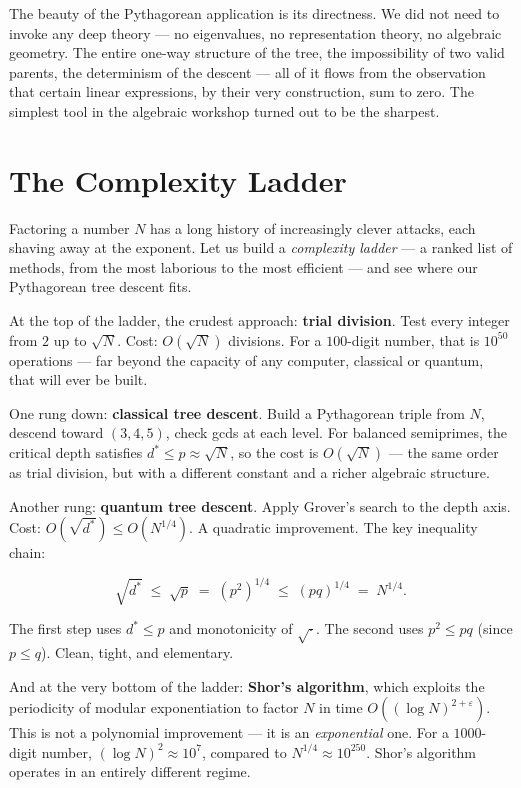 \documentclass[11pt,twoside,openright]{book}
\theoremstyle{definition}
\theoremstyle{remark}
\begin{document}
The beauty of the Pythagorean application is its directness. We did not need to invoke any deep theory --- no eigenvalues, no representation theory, no algebraic geometry. The entire one-way structure of the tree, the impossibility of two valid parents, the determinism of the descent --- all of it flows from the observation that certain linear expressions, by their very construction, sum to zero. The simplest tool in the algebraic workshop turned out to be the sharpest.



\section{The Complexity Ladder}

Factoring a number $N$ has a long history of increasingly clever attacks, each shaving away at the exponent. Let us build a \textit{complexity ladder} --- a ranked list of methods, from the most laborious to the most efficient --- and see where our Pythagorean tree descent fits.

At the top of the ladder, the crudest approach: \textbf{trial division}. Test every integer from $2$ up to $\sqrt{N}$. Cost: $O(\sqrt{N})$ divisions. For a $100$-digit number, that is $10^{50}$ operations --- far beyond the capacity of any computer, classical or quantum, that will ever be built.

One rung down: \textbf{classical tree descent}. Build a Pythagorean triple from $N$, descend toward $(3, 4, 5)$, check gcds at each level. For balanced semiprimes, the critical depth satisfies $d^* \leq p \approx \sqrt{N}$, so the cost is $O(\sqrt{N})$ --- the same order as trial division, but with a different constant and a richer algebraic structure.

Another rung: \textbf{quantum tree descent}. Apply Grover's search to the depth axis. Cost: $O(\sqrt{d^*}) \leq O(N^{1/4})$. A quadratic improvement. The key inequality chain:

\[\sqrt{d^*} \;\leq\; \sqrt{p} \;=\; (p^2)^{1/4} \;\leq\; (pq)^{1/4} \;=\; N^{1/4}.\]

The first step uses $d^* \leq p$ and monotonicity of $\sqrt{\cdot}$. The second uses $p^2 \leq pq$ (since $p \leq q$). Clean, tight, and elementary.

And at the very bottom of the ladder: \textbf{Shor's algorithm}, which exploits the periodicity of modular exponentiation to factor $N$ in time $O((\log N)^{2+\varepsilon})$. This is not a polynomial improvement --- it is an \textit{exponential} one. For a $1000$-digit number, $(\log N)^2 \approx 10^7$, compared to $N^{1/4} \approx 10^{250}$. Shor's algorithm operates in an entirely different regime.
\end{document}
